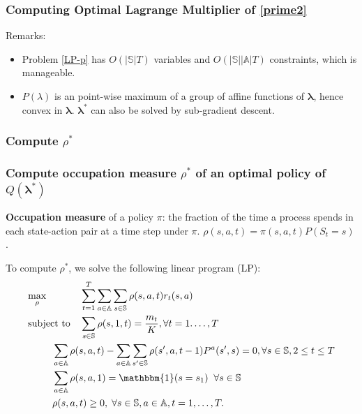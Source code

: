 \documentclass{beamer}
\newcommand{\lambdav}{\pmb{\lambda}}
\newcommand{\ind}[1]{\mathbbm{1}(#1)}
\newcommand{\substates}{\mathbb{S}}
\newcommand{\substate}{s}
\newcommand{\subactions}{\mathbb{A}}
\newcommand{\subpr}{P}
\begin{document}
\begin{frame}[plain]
\frametitle{Computing Optimal Lagrange Multiplier of \eqref{prime2}}
Remarks:
\begin{itemize}
\item Problem \eqref{LP-p} has $O(|\substates|T)$ variables and $O(|\substates||\subactions|T)$ constraints, which is manageable.
\item $P(\lambda)$ is an point-wise maximum of a group of affine functions of $\lambdav$, hence convex in $\lambdav$. $\lambdav^*$ can also be solved by sub-gradient descent.
\end{itemize}
\end{frame}

\subsubsection{Compute $\rho^*$}
\begin{frame}[plain]
\frametitle{Compute occupation measure $\rho^*$ of an optimal policy of $Q(\lambdav^*)$}
\textbf{Occupation measure} of a policy $\pi$: the fraction of the time a process spends in each state-action pair at a time step under $\pi$. $\rho(s,a,t) = \pi(s,a,t)P(S_t=s)$.

\vspace{0.5cm}
To compute $\rho^*$, we solve the following linear program (LP):
\small
\begin{equation}\label{eq:lp}
\begin{aligned}
& \underset{\rho}{\text{max}}
& & \sum_{t=1}^{T}\sum_{a\in\subactions}\sum_{s\in\substates}\rho(s,a,t)r_t(s,a) \\
& \text{subject to}
& & \sum_{s\in\substates}\rho(s,1,t)=\frac{m_t}{K}, \forall t=1.\ldots,T\\
& & & \hspace{-1cm}\sum_{a\in \subactions}\rho(s,a,t) - \sum_{a\in\subactions}\sum_{s'\in\substates}\rho(s',a,t-1)\subpr^{a}(s',s)=0, \forall \substate\in\substates,2\leq t\leq T\\
& & & \hspace{-1cm}\sum_{a\in\subactions}\rho(s,a,1)=\ind{s=s_1} \;\;\forall s\in\substates\\
& & & \hspace{-1cm}\rho(s,a,t)\geq 0, \; \forall s\in\substates,a\in\subactions,t=1,\ldots,T.
\end{aligned}
\end{equation}
\end{frame}
\end{document}

